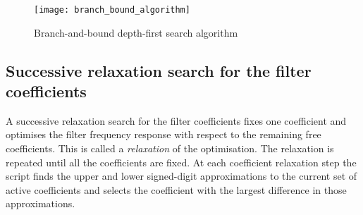 \documentclass[a4paper,twoside,10pt,english]{article}
\newcommand{\DesignOfSchurLatticeFiltersIncludeScale}{0.85}
\begin{document}
\begin{figure}
\centering
\texttt{[image: branch\_bound\_algorithm]}
\caption{Branch-and-bound depth-first search algorithm}
\label{fig:branch-bound-tree-search-algorithm}
\end{figure}

\subsection{Successive relaxation search for the filter coefficients}
A successive relaxation search for the filter coefficients fixes one
coefficient and optimises the filter frequency response with respect to the
remaining free coefficients. This is called a \emph{relaxation} of the
optimisation. The relaxation is repeated until all the coefficients are fixed.
At each coefficient relaxation step the script finds the upper and lower
signed-digit approximations to the current set of active coefficients and
selects the coefficient with the largest difference in those approximations.

\clearpage
\end{document}
